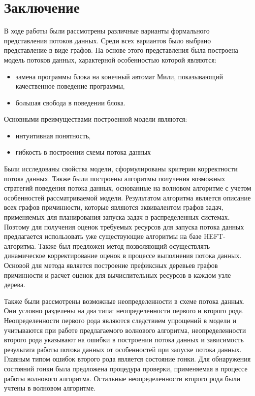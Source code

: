 \documentclass[10pt,a4paper]{article}
\begin{document}
\section{Заключение}
  В ходе работы были рассмотрены различные варианты формального представления потоков данных.
  Среди всех вариантов было выбрано представление в виде графов. На основе этого представления
  была построена модель потоков данных, характерной особенностью которой являются:
  \begin{itemize}
    \item замена программы блока на конечный автомат Мили, показывающий качественное поведение программы,
    \item большая свобода в поведении блока.
  \end{itemize}
  
  Основными преимуществами построенной модели являются:
  \begin{itemize}
    \item интуитивная понятность,
    \item гибкость в построении схемы потока данных
  \end{itemize}
  
  Были исследованы свойства модели, сформулированы критерии корректности потока данных.
  Также были построены алгоритмы получения возможных стратегий поведения потока данных,
  основанные на волновом алгоритме с учетом особенностей рассматриваемой модели.
  Результатом алгоритма является описание всех графов причинности, которые являются эквивалентом графов задач,
  применяемых для планирования запуска задач в распределенных системах.
  Поэтому для получения оценок требуемых ресурсов для запуска потока данных
  предлагается использовать уже существующие алгоритмы на базе HEFT-алгоритма.
  Также был предложен метод позволяющий осуществлять динамическое корректирование оценок в процессе выполнения потока данных.
  Основой для метода является построение префиксных деревьев графов причинности и расчет оценок для вычислительных ресурсов в каждом узле дерева.
    
  Также были рассмотрены возможные неопределенности в схеме потока данных. Они условно разделены на два типа: неопределенности первого и второго рода.
  Неопределенности первого рода являются следствием упрощений в модели и учитываются при работе предлагаемого волнового алгоритма, неопределенности второго рода
  указывают на ошибки в построении потока данных и зависимость результата работы потока данных от особенностей при запуске потока данных.
  Главным типом ошибок второго рода является состояние гонки. Для обнаружения состояний гонки была предложена процедура проверки, применяемая
  в процессе работы волнового алгоритма. Остальные неопределенности второго рода были учтены в волновом алгоритме.
  
\end{document}
